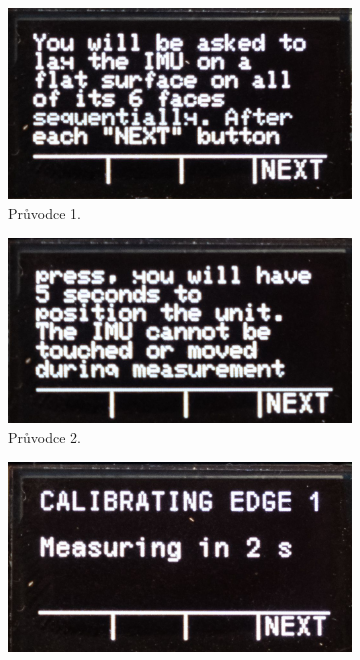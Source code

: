 \begin{figure}[h]
     \centering
     \begin{subfigure}[b]{0.24\textwidth}
         \centering
         \includegraphics[width=\textwidth]{obrazky/menuCAL1}
         \caption{Průvodce 1.}     
     \end{subfigure}
     \hfill
     \centering
     \begin{subfigure}[b]{0.24\textwidth}
         \centering
         \includegraphics[width=\textwidth]{obrazky/menuCAL2}
         \caption{Průvodce 2.}   
     \end{subfigure}
     \hfill
          \centering
     \begin{subfigure}[b]{0.24\textwidth}
         \centering
         \includegraphics[width=\textwidth]{obrazky/menuCAL3}

\end{subfigure}
\end{figure}
